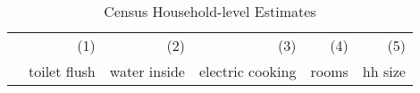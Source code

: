 \documentclass[12pt]{article}
\begin{document}







% 
% 


\begin{table}
\small
\centering
\caption{Census Household-level Estimates }\label{table:censusestimates}
\vspace{-2mm}
\begin{tabular}{lDDDDD}
\toprule
& \small (1) & \small (2)  & \small (3) & \small (4) & \small (5)  \\
  & toilet flush &  water inside & electric cooking & rooms & hh size \\ 


\end{tabular}
\end{table}
\end{document}

